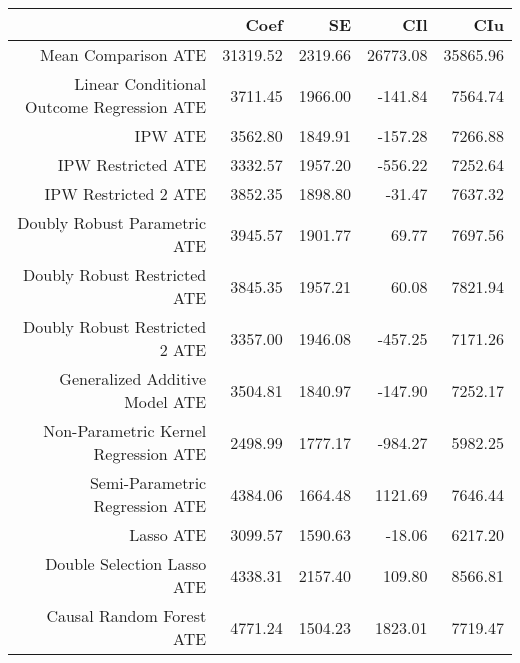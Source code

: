 \begin{table}[ht]
\centering
\begin{tabular}{rrrrr}
  \hline
 & Coef & SE & CIl & CIu \\ 
  \hline
Mean Comparison ATE & 31319.52 & 2319.66 & 26773.08 & 35865.96 \\ 
  Linear Conditional Outcome Regression ATE & 3711.45 & 1966.00 & -141.84 & 7564.74 \\ 
  IPW ATE & 3562.80 & 1849.91 & -157.28 & 7266.88 \\ 
  IPW Restricted ATE & 3332.57 & 1957.20 & -556.22 & 7252.64 \\ 
  IPW Restricted 2 ATE & 3852.35 & 1898.80 & -31.47 & 7637.32 \\ 
  Doubly Robust Parametric ATE & 3945.57 & 1901.77 & 69.77 & 7697.56 \\ 
  Doubly Robust Restricted ATE & 3845.35 & 1957.21 & 60.08 & 7821.94 \\ 
  Doubly Robust Restricted 2 ATE & 3357.00 & 1946.08 & -457.25 & 7171.26 \\ 
  Generalized Additive Model ATE & 3504.81 & 1840.97 & -147.90 & 7252.17 \\ 
  Non-Parametric Kernel Regression ATE & 2498.99 & 1777.17 & -984.27 & 5982.25 \\ 
  Semi-Parametric Regression ATE & 4384.06 & 1664.48 & 1121.69 & 7646.44 \\ 
  Lasso ATE & 3099.57 & 1590.63 & -18.06 & 6217.20 \\ 
  Double Selection Lasso ATE & 4338.31 & 2157.40 & 109.80 & 8566.81 \\ 
  Causal Random Forest ATE & 4771.24 & 1504.23 & 1823.01 & 7719.47 \\ 
   \hline
\end{tabular}
\end{table}
